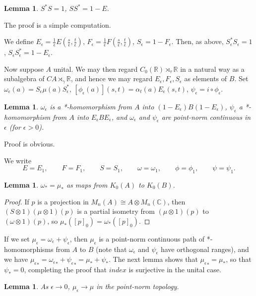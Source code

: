 \documentclass{book}
\newtheorem{lemma}[definition]{Lemma}
\begin{document}
\begin{lemma}
  \(S^*S=1\), \(SS^*=1-E\).
\end{lemma}
The proof is a simple computation.\par
We define \(E_\epsilon=\frac{1}{\epsilon}E(\frac{s}{\epsilon},\frac{t}{\epsilon})\), \(F_\epsilon=\frac{1}{\epsilon}F(\frac{s}{\epsilon},\frac{t}{\epsilon})\), \(S_\epsilon=1-F_\epsilon\). Then,
as above, \(S_\epsilon^*S_\epsilon=1\), \(S_\epsilon S_\epsilon^*=1-E_\epsilon\).\par
Now suppose \(A\) unital. We may then regard \(C_0(\mathbb{R})\rtimes_\tau\mathbb{R}\) in a natural way
as a subalgebra of \(CA\rtimes_\gamma\mathbb{R}\), and hence we may regard \(E_\epsilon, F_\epsilon, S_\epsilon\) as elements of \(B\).
Set \(\omega_\epsilon(a)=S_\epsilon\mu(a)S_\epsilon^*\), \([\phi_\epsilon(a)](s,t)=\alpha_t(a)E_\epsilon(s,t)\), \(\psi_\epsilon=i\circ\phi_\epsilon\).
\begin{lemma}
  \(\omega_\epsilon\) is a *-homomorphism from \(A\) into \((1-E_\epsilon)B(1-E_\epsilon)\),
  \(\psi_\epsilon\) a *-homomorphism from \(A\) into \(E_\epsilon BE_\epsilon\), and \(\omega_\epsilon\) and \(\psi_\epsilon\) are point-norm continuous
  in \(\epsilon\) (for \(\epsilon>0\)).
\end{lemma}
Proof is obvious.\par
We write
  \[
    E=E_1,\qquad F=F_1,\qquad S=S_1,
    \qquad
    \omega=\omega_1,\qquad
    \phi=\phi_1,\qquad
    \psi=\psi_1.
  \]
\begin{lemma}  
  \(\omega_*=\mu_*\) as maps from \(K_0(A)\) to \(K_0(B)\).
\end{lemma}
\begin{proof}
  If \(p\) is a projection in \(M_n(A)\cong A\otimes M_n(\mathbb{C})\), then \((S\otimes1)(\mu\otimes1)(p)\)
  is a partial isometry from \((\mu\otimes1)(p)\) to \((\omega\otimes1)(p)\), so \(\mu_*({[p]}_0)=\omega_*({[p]}_0)\).
\end{proof}
If we set \(\mu_\epsilon=\omega_\epsilon+\psi_\epsilon\), then \(\mu_\epsilon\) is a point-norm continuous path of *-homomorphisms
from \(A\) to \(B\) (note that \(\omega_\epsilon\) and \(\psi_\epsilon\) have orthogonal ranges), and we
have \({\mu_\epsilon}_*={\omega_\epsilon}_*+{\psi_\epsilon}_*=\mu_*+\psi_*\). The next lemma shows that \({\mu_\epsilon}_*=\mu_*\),
so that \(\psi_*=0\), completing the proof that \(index\) is surjective in the unital case.
\begin{lemma}
  As \(\epsilon\rightarrow0\), \(\mu_\epsilon\rightarrow\mu\) in the point-norm topology.
\end{lemma}
\end{document}
